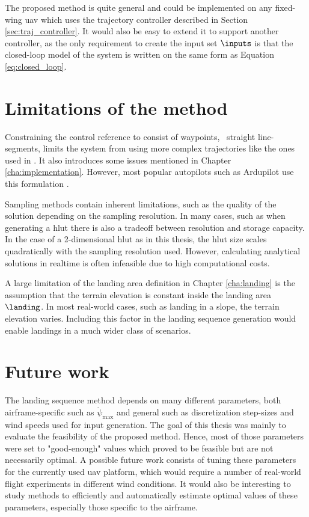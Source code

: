 The proposed method is quite general and could be implemented on any fixed-wing \ac{uav} which uses the trajectory controller described in Section \ref{sec:traj_controller}. 
It would also be easy to extend it to support another controller, as the only requirement to create the input set $\inputs$ is that the closed-loop model of the system is written on the same form as 
Equation \ref{eq:closed_loop}.

\section{Limitations of the method}
Constraining the control reference to consist of waypoints, \ie\ straight line-segments, limits the system from using more complex trajectories like the ones used in \cite{emergency_landing}. It also introduces some issues mentioned in Chapter \ref{cha:implementation}. 
However, most popular autopilots such as Ardupilot use this formulation \cite{arduplane}. 

Sampling methods contain inherent limitations, such as the 
quality of the solution depending on the sampling resolution. In many cases, such as when generating a \ac{hlut} there is also a tradeoff between resolution and storage capacity. In the case of a 2-dimensional \ac{hlut} as in this thesis, the \ac{hlut} size scales quadratically with the sampling resolution used. 
However, calculating analytical solutions in realtime is often infeasible due to high computational costs.

A large limitation of the landing area definition in Chapter \ref{cha:landing} is the assumption that the terrain elevation is constant inside the landing area $\landing$. In 
most real-world cases, such as landing in a slope, the terrain elevation varies. Including this factor in the landing sequence generation would enable landings in a much wider class of scenarios.

\section{Future work}
The landing sequence method depends on many different parameters, both airframe-specific such as $\dot{\psi}_{\text{max}}$ and general such as discretization step-sizes and wind speeds used for input generation.
The goal of this thesis was mainly to evaluate the feasibility of the proposed method. Hence, most of those parameters were set to "good-enough" values which proved to be feasible but are not necessarily optimal. 
A possible future work consists of tuning these parameters for the currently used \ac{uav} platform, which would require a number of real-world flight experiments in different wind conditions.
It would also be interesting to study methods to efficiently and automatically estimate optimal values of these parameters, especially those specific to the airframe.

